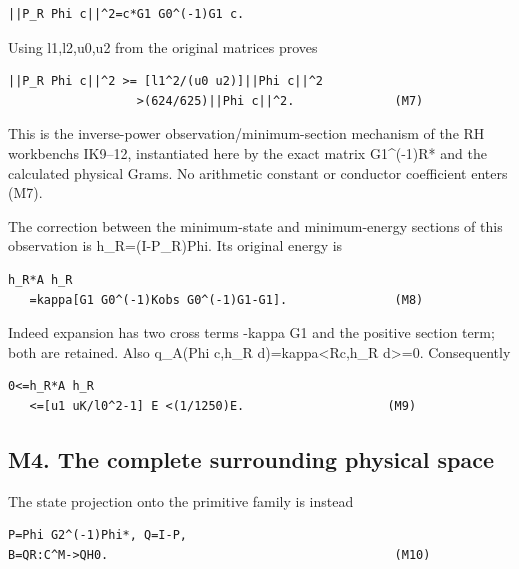 \documentclass[11pt,a4paper]{article}
\renewcommand{\[}{\begingroup\small\originaldisplaystart}
\renewcommand{\]}{\originaldisplayend\endgroup}
\begin{document}
\begin{verbatim}
||P_R Phi c||^2=c*G1 G0^(-1)G1 c.
\end{verbatim}

Using l1,l2,u0,u2 from the original matrices proves

\begin{verbatim}
||P_R Phi c||^2 >= [l1^2/(u0 u2)]||Phi c||^2
                  >(624/625)||Phi c||^2.              (M7)
\end{verbatim}

This is the inverse-power
{o\allowbreak{}b\allowbreak{}s\allowbreak{}e\allowbreak{}r\allowbreak{}v\allowbreak{}a\allowbreak{}t\allowbreak{}i\allowbreak{}o\allowbreak{}n\allowbreak{}/\allowbreak{}m\allowbreak{}i\allowbreak{}n\allowbreak{}i\allowbreak{}m\allowbreak{}u\allowbreak{}m\allowbreak{}-\allowbreak{}s\allowbreak{}e\allowbreak{}c\allowbreak{}t\allowbreak{}i\allowbreak{}o\allowbreak{}n\allowbreak{}}
mechanism of the RH workbench\textquotesingle s IK9--12, instantiated
here by the exact matrix G1\^{}(-1)R* and the calculated physical Grams.
No arithmetic constant or conductor coefficient enters (M7).

The correction between the minimum-state and minimum-energy sections of
this observation is h\_R=(I-P\_R)Phi. Its original energy is

\begin{verbatim}
h_R*A h_R
   =kappa[G1 G0^(-1)Kobs G0^(-1)G1-G1].               (M8)
\end{verbatim}

Indeed expansion has two cross terms -kappa G1 and the positive section
term; both are retained. Also q\_A(Phi c,h\_R d)=kappa\textless Rc,h\_R
d\textgreater=0. Consequently

\begin{verbatim}
0<=h_R*A h_R
   <=[u1 uK/l0^2-1] E <(1/1250)E.                    (M9)
\end{verbatim}

\subsection{M4. The complete surrounding physical
space}\label{m4.-the-complete-surrounding-physical-space}

The state projection onto the primitive family is instead

\begin{verbatim}
P=Phi G2^(-1)Phi*, Q=I-P,
B=QR:C^M->QH0.                                        (M10)
\end{verbatim}
\end{document}
